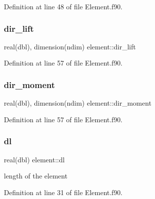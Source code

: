 Definition at line 48 of file Element.\+f90.

\mbox{\label{namespaceelement_a10ce0718ec68d00dd9fab0c290410366}} 
\subsubsection{\texorpdfstring{dir\+\_\+lift}{dir\_lift}}
{\footnotesize\ttfamily real(dbl), dimension(ndim) element\+::dir\+\_\+lift\hspace{0.3cm}{\ttfamily [private]}}



Definition at line 57 of file Element.\+f90.

\mbox{\label{namespaceelement_a88c83da354d518bfd81c3ef7691b4682}} 
\subsubsection{\texorpdfstring{dir\+\_\+moment}{dir\_moment}}
{\footnotesize\ttfamily real(dbl), dimension(ndim) element\+::dir\+\_\+moment\hspace{0.3cm}{\ttfamily [private]}}



Definition at line 57 of file Element.\+f90.

\mbox{\label{namespaceelement_a2ba7b882a33de416921d1a35d3a5e23a}} 
\subsubsection{\texorpdfstring{dl}{dl}}
{\footnotesize\ttfamily real(dbl) element\+::dl\hspace{0.3cm}{\ttfamily [private]}}



length of the element 



Definition at line 31 of file Element.\+f90.

\mbox{\label{namespaceelement_aa1c0af00208b47c11ed5b1dc17fb33b3}} 
